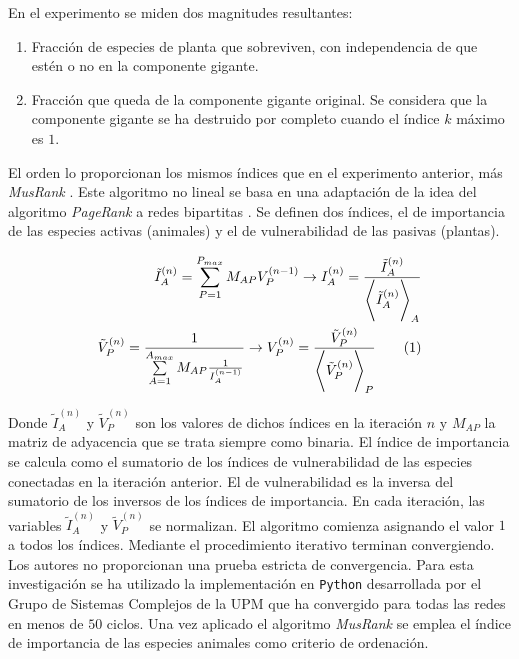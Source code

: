 En el experimento se miden dos magnitudes resultantes:

\begin{enumerate}
\item Fracción de especies de planta que sobreviven, con independencia de que estén o no en la componente gigante.
\item Fracción que queda de la componente gigante original. Se considera que la componente gigante se ha destruido por completo cuando el índice $k$ máximo es $1$.
\end{enumerate}

El orden lo proporcionan los mismos índices que en el experimento anterior, más \textit{MusRank} \cite{dominguez2015ranking}. Este algoritmo no lineal se basa en una adaptación de la idea del algoritmo \textit{PageRank} a redes bipartitas \cite{tacchella2012new}. Se definen dos índices, el de importancia de las especies activas (animales) y el de vulnerabilidad de las pasivas (plantas).

\begin{align}
\tilde{I}^{(n)}_{A} =  \sum\limits_{P=1}^{{P}_{max}} {M}_{AP} {V}^{(n-1)}_{P} \rightarrow  {I}^{(n)}_{A} = \frac{\tilde{I}^{(n)}_{A}}{ {\Bigg \langle \tilde{I}^{(n)}_{A} \Bigg \rangle}_{A} }
\nonumber\\ 
\tilde{V}^{(n)}_{P} =  \frac{1}{\sum\limits_{A=1}^{{A}_{max}} {M}_{AP} \frac{1}{{I}^{(n-1)}_{A}} } \rightarrow  {V}^{(n)}_{P} = \frac{\tilde{V}^{(n)}_{P}}{ {\Bigg \langle \tilde{V}^{(n)}_{P} \Bigg \rangle}_{P} }
\stepcounter{equation}\tag{\theequation}\label{eq:DEST_MusRank}
\end{align}

Donde $\tilde{I}^{(n)}_{A}$ y $\tilde{V}^{(n)}_{P}$ son los valores de dichos índices en la iteración $n$ y ${M}_{AP}$ la matriz de adyacencia que se trata siempre como binaria. El índice de importancia se calcula como el sumatorio de los índices de vulnerabilidad de las especies conectadas en la iteración anterior. El de vulnerabilidad es la inversa del sumatorio de los inversos de los índices de importancia. En cada iteración, las variables $\tilde{I}^{(n)}_{A}$ y $\tilde{V}^{(n)}_{P}$ se normalizan. El algoritmo comienza asignando el valor $1$ a todos los índices. Mediante el procedimiento iterativo terminan convergiendo. Los autores no proporcionan una prueba estricta de convergencia. Para esta investigación se ha utilizado la implementación en \texttt{Python} desarrollada por el Grupo de Sistemas Complejos de la UPM que ha convergido para todas las redes en menos de $50$ ciclos. Una vez aplicado el algoritmo \textit{MusRank} se emplea el índice de importancia de las especies animales como criterio de ordenación.

